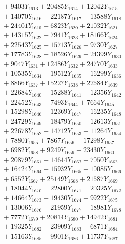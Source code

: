 \documentclass[a4paper,10pt]{article}
\begin{document}
{\begin{align}
&\;  + 9403 Y_{1613} + 20485 Y_{1614} + 12042 Y_{1615} \\[0.3ex]
&\;  + 14070 Y_{1616} + 22187 Y_{1617} + 13588 Y_{1618} \\[0.5ex]\allowbreak
&\;  + 24401 Y_{1619} + 6823 Y_{1620} + 21032 Y_{1621} \\[0.3ex]
&\;  + 14315 Y_{1622} + 7941 Y_{1623} + 18166 Y_{1624} \\[0.3ex]
&\;  + 22543 Y_{1625} + 15713 Y_{1626} + 9730 Y_{1627} \\[0.3ex]
&\;  + 17783 Y_{1628} + 18526 Y_{1629} + 24399 Y_{1630} \\[0.3ex]
&\;  + 9047 Y_{1631} + 12486 Y_{1632} + 24770 Y_{1633} \\[0.3ex]
&\;  + 10535 Y_{1634} + 19512 Y_{1635} + 16299 Y_{1636} \\[0.3ex]
&\;  + 8866 Y_{1637} + 15227 Y_{1638} + 22684 Y_{1639} \\[0.3ex]
&\;  + 22684 Y_{1640} + 15288 Y_{1641} + 12356 Y_{1642} \\[0.3ex]
&\;  + 22452 Y_{1643} + 7493 Y_{1644} + 7664 Y_{1645} \\[0.3ex]
&\;  + 15298 Y_{1646} + 12369 Y_{1647} + 16235 Y_{1648} \\[0.5ex]\allowbreak
&\;  + 24729 Y_{1649} + 18479 Y_{1650} + 12613 Y_{1651} \\[0.3ex]
&\;  + 22678 Y_{1652} + 14712 Y_{1653} + 11264 Y_{1654} \\[0.3ex]
&\;  + 7880 Y_{1655} + 7867 Y_{1656} + 17298 Y_{1657} \\[0.3ex]
&\;  + 6982 Y_{1658} + 9249 Y_{1659} + 23430 Y_{1660} \\[0.3ex]
&\;  + 20879 Y_{1661} + 14644 Y_{1662} + 7050 Y_{1663} \\[0.3ex]
&\;  + 16424 Y_{1664} + 15932 Y_{1665} + 10085 Y_{1666} \\[0.3ex]
&\;  + 6552 Y_{1667} + 25149 Y_{1668} + 21687 Y_{1669} \\[0.3ex]
&\;  + 18044 Y_{1670} + 22800 Y_{1671} + 20325 Y_{1672} \\[0.3ex]
&\;  + 14664 Y_{1673} + 19430 Y_{1674} + 9922 Y_{1675} \\[0.3ex]
&\;  + 13006 Y_{1676} + 21959 Y_{1677} + 18981 Y_{1678} \\[0.5ex]\allowbreak
&\;  + 7772 Y_{1679} + 20814 Y_{1680} + 14942 Y_{1681} \\[0.3ex]
&\;  + 19325 Y_{1682} + 23909 Y_{1683} + 6871 Y_{1684} \\[0.3ex]
&\;  + 15163 Y_{1685} + 9901 Y_{1686} + 11737 Y_{1687} \\[0.3ex]

\end{align}}
\end{document}
